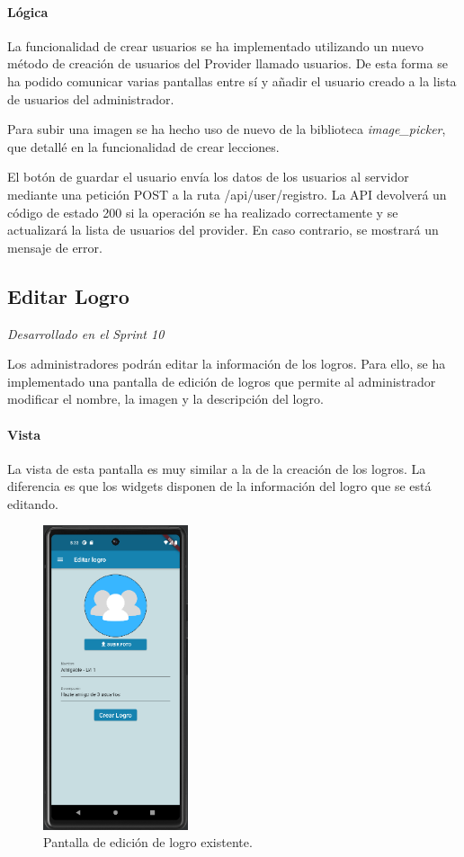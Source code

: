 \paragraph*{Lógica}
La funcionalidad de crear usuarios se ha implementado utilizando un nuevo método de creación de usuarios del Provider llamado usuarios. De esta forma
se ha podido comunicar varias pantallas entre sí y añadir el usuario creado a la lista de usuarios del administrador.


Para subir una imagen se ha hecho uso de nuevo de la biblioteca \textit{image\_picker}, que detallé en la funcionalidad de crear lecciones.

El botón de guardar el usuario envía los datos de los usuarios al servidor mediante una petición POST a la ruta /api/user/registro. La API devolverá un código de estado 200 si la operación se ha realizado correctamente y se actualizará la lista de usuarios del provider. En caso contrario, se mostrará un mensaje de error.


\subsection{Editar Logro} 

\textit{Desarrollado en el Sprint 10}

Los administradores podrán editar la información de los logros. Para ello, se ha implementado una pantalla de edición de logros que permite al administrador modificar el nombre, la imagen y la descripción del logro.

\paragraph*{Vista}
La vista de esta pantalla es muy similar a la de la creación de los logros. La diferencia es que los widgets disponen de la información del logro que se está editando.

\begin{figure}[H]
  \centering
  \includegraphics[width=0.38\textwidth]{imagenes/c7/editarlogro.png}
  \caption{Pantalla de edición de logro existente.} 
  \label{fig:edicion_logro}
\end{figure}


